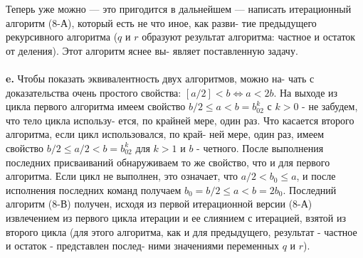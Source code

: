 Теперь уже можно — это пригодится в дальнейшем — написать\linebreak
итерационный алгоритм (8-А), который есть не что иное, как разви-\linebreak
тие предыдущего рекурсивного алгоритма ($q$ и $r$ образуют результат\linebreak
алгоритма: частное и остаток от деления). Этот алгоритм яснее вы-\linebreak
являет поставленную задачу.\\\\
\hspace*{15pt}\textbf{e.} Чтобы показать эквивалентность двух алгоритмов, можно на-\linebreak
чать с доказательства очень простого свойства: $[a/2]<b\Leftrightarrow a<2b$.\newline
\hspace*{15pt}На выходе из цикла первого алгоритма имеем свойство\linebreak
$b/2\leqslant a<b=b_02^k$ с $k>0$ - не забудем, что тело цикла использу-\linebreak
ется, по крайней мере, один раз.\newline
\hspace*{15pt}Что касается второго алгоритма, если цикл использовался, по край-\linebreak
ней мере, один раз, имеем свойство $b/2\leqslant a/2<b=b_02^k$ для $k>1$ и\linebreak
$b$ - четного. После выполнения последних присваиваний обнаруживаем\linebreak
то же свойство, что и для первого алгоритма. Если цикл не выполнен,\linebreak
это означает, что $a/2<b_0\leqslant a$, и после исполнения последних команд\linebreak
получаем $b_0=b/2\leqslant a<b=2b_0$.\newline
\hspace*{15pt}Последний алгоритм (8-В) получен, исходя из первой итерационной\linebreak
версии (8-А) извлечением из первого цикла итерации и ее слиянием с\linebreak
итерацией, взятой из второго цикла (для этого алгоритма, как и для\linebreak
предыдущего, результат - частное и остаток - представлен послед-\linebreak
ними значениями переменных $q$ и $r$).\\

